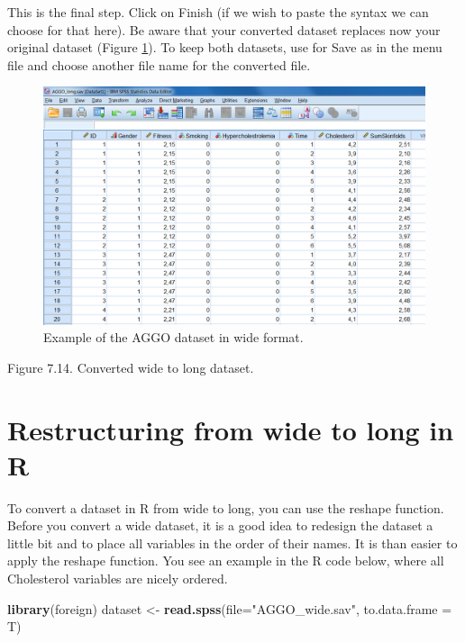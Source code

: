 \documentclass[
]{book}
\newenvironment{Shaded}{\begin{snugshade}}{\end{snugshade}}
\newcommand{\DataTypeTok}[1]{\textcolor[rgb]{0.13,0.29,0.53}{#1}}
\newcommand{\KeywordTok}[1]{\textcolor[rgb]{0.13,0.29,0.53}{\textbf{#1}}}
\newcommand{\NormalTok}[1]{#1}
\newcommand{\StringTok}[1]{\textcolor[rgb]{0.31,0.60,0.02}{#1}}
\begin{document}
This is the final step. Click on Finish (if we wish to paste the syntax we can choose for that here). Be aware that your converted dataset replaces now your original dataset (Figure \ref{fig:fig84}). To keep both datasets, use for Save as in the menu file and choose another file name for the converted file.

\begin{figure}

{\centering \includegraphics[width=0.9\linewidth]{images/fig7.14} 

}

\caption{Example of the AGGO dataset in wide format.}\label{fig:fig84}
\end{figure}

Figure 7.14. Converted wide to long dataset.

\hypertarget{restructuring-from-wide-to-long-in-r}{%
\section{Restructuring from wide to long in R}\label{restructuring-from-wide-to-long-in-r}}

To convert a dataset in R from wide to long, you can use the reshape function. Before you convert a wide dataset, it is a good idea to redesign the dataset a little bit and to place all variables in the order of their names. It is than easier to apply the reshape function. You see an example in the R code below, where all Cholesterol variables are nicely ordered.

\begin{Shaded}
\begin{Highlighting}[]
\KeywordTok{library}\NormalTok{(foreign)}
\NormalTok{dataset <-}\StringTok{ }\KeywordTok{read.spss}\NormalTok{(}\DataTypeTok{file=}\StringTok{"AGGO_wide.sav"}\NormalTok{, }\DataTypeTok{to.data.frame =}\NormalTok{ T)}
\end{Highlighting}
\end{Shaded}
\end{document}
